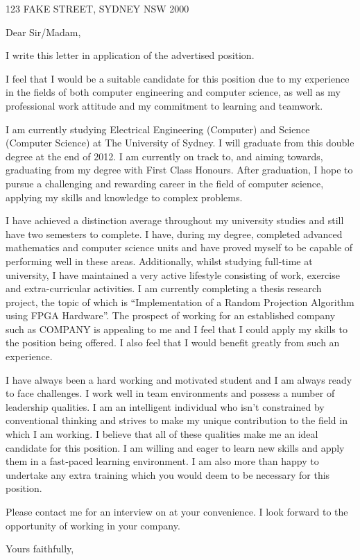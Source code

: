 \documentclass{letter}
\newcommand{\company}{COMPANY}
\newcommand{\toAddress}{123 FAKE STREET, SYDNEY NSW 2000}
\begin{document}
\begin{letter}{\toAddress}

\opening{Dear Sir/Madam,}

I write this letter in application of the advertised position.

I feel that I would be a suitable candidate for this position due to my
experience in the fields of both computer engineering and computer science, as
well as my professional work attitude and my commitment to learning and
teamwork.

I am currently studying Electrical Engineering (Computer) and Science (Computer
Science) at The University of Sydney. I will graduate from this double degree at
the end of 2012. I am currently on track to, and aiming towards, graduating from
my degree with First Class Honours. After graduation, I hope to pursue a
challenging and rewarding career in the field of computer science, applying my
skills and knowledge to complex problems.

I have achieved a distinction average throughout my university studies and still
have two semesters to complete. I have, during my degree, completed advanced
mathematics and computer science units and have proved myself to be capable of
performing well in these areas. Additionally, whilst studying full-time at
university, I have maintained a very active lifestyle consisting of work,
exercise and extra-curricular activities. I am currently completing a thesis
research project, the topic of which is ``Implementation of a Random Projection
Algorithm using FPGA Hardware''. The prospect of working for an established
company such as \company{} is appealing to me and I feel that I could apply my
skills to the position being offered. I also feel that I would benefit greatly
from such an experience.

I have always been a hard working and motivated student and I am always ready to
face challenges. I work well in team environments and possess a number of
leadership qualities. I am an intelligent individual who isn't constrained by
conventional thinking and strives to make my unique contribution to the field in
which I am working. I believe that all of these qualities make me an ideal
candidate for this position. I am willing and eager to learn new skills and
apply them in a fast‐paced learning environment. I am also more than happy to
undertake any extra training which you would deem to be necessary for this
position.

Please contact me for an interview on \myMobile{} at your convenience. I look
forward to the opportunity of working in your company.

\closing{Yours faithfully,}

\end{letter}
\end{document}
